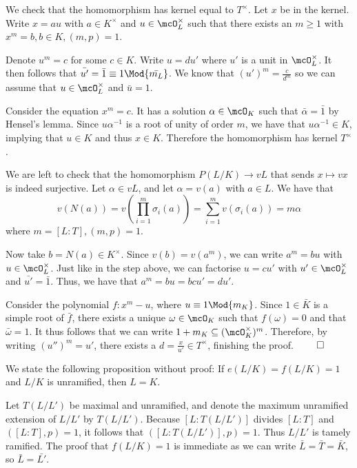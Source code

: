 \documentclass[a4paper, 12pt,oneside,openany]{book}
\begin{document}

We check that the homomorphism has kernel equal to $T^\times$. Let $x$ be in the kernel. Write $x = au$ with $a \in K^\times$ and $u \in \mcO_L^\times$ such that there exists an $m \geq 1$ with $x^m=b, b\in K, (m, p)=1$.

Denote $u^m=c$ for some $c \in K$. Write $u=du'$ where $u'$ is a unit in $\mcO_L^\times$. It then follows that $\bar{u'}=\bar{1} \equiv 1\Mod{\bar{m_L}}$. We know that ${(u')}^m=\frac{c}{d^m}$ so we can assume that $u \in \mcO_L^\times$ and $\bar{u}=1$.

Consider the equation $x^m=c$. It has a solution $\alpha \in \mcO_K$ such that $\bar{\alpha}=\bar{1}$ by Hensel's lemma. Since $u\alpha^{-1}$ is a root of unity of order $m$, we have that $u\alpha^{-1} \in K$, implying that $u \in K$ and thus $x \in K$. Therefore the homomorphism has kernel $T^\times$.

We are left to check that the homomorphism $P(L/K) \to vL$ that sends $x \mapsto vx$ is indeed surjective. Let $\alpha \in vL$, and let $\alpha=v(a)$ with $a \in L$. We have that $$v(N(a)) = v\left( \prod\limits_{i=1}^m \sigma_i(a)\right)= \sum\limits_{i=1}^m v(\sigma_i(a)) = m\alpha$$ where $m = [L:T], (m, p)=1$.

Now take $b = N(a) \in K^\times$. Since $v(b) = v(a^m)$, we can write $a^m= bu$ with $u \in \mcO_L^\times$. Just like in the step above, we can factorise $u = cu'$ with $u' \in \mcO_L^\times$ and $\bar{u'}=\bar{1}$. Thus, we have that $a^m = bu = bcu' = du'$.

Consider the polynomial $f:x^m-u$, where $u \equiv 1 \Mod{m_K}$. Since $1 \in \bar{K}$ is a simple root of $\bar{f}$, there exists a unique $\omega \in \mcO_K$ such that $f(\omega)=0$ and that $\bar{\omega}=1$. It thus follows that we can write $1+m_K \subseteq (\mcO_K^\times)^m$. Therefore, by writing $(u'')^m = u'$, there exists a $d = \frac{x}{u'} \in T^\times$, finishing the proof. $\qed$

We state the following proposition without proof: If $e(L/K)=f(L/K)=1$ and $L/K$ is unramified, then $L=K$. 

Let $T(L/L')$ be maximal and unramified, and denote the maximum unramified extension of $L/L'$ by $T(L/L')$. Because $[L:T(L/L')]$ divides $[L:T]$ and $([L:T], p)=1$, it follows that $([L:T(L/L')], p)=1.$ Thus $L/L'$ is tamely ramified. The proof that $f(L/K)=1$ is immediate as we can write $\bar{L}=\bar{T}=\bar{K}$, so $\bar{L}=\bar{L'}$. 
\end{document}
